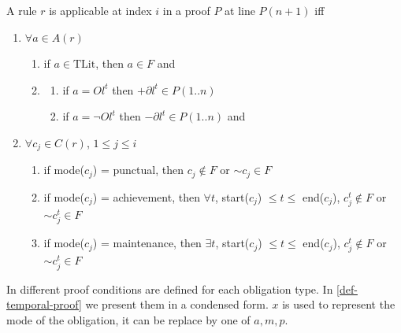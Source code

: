 \documentclass[10pt]{report}
\begin{document}
\begin{mydef} \label{def-temporal-applicable}
A rule $r$ is applicable at index $i$ in a proof $P$ at line $P(n+1)$ iff
\begin{enumerate}
\item $\forall a \in A(r)$
      \begin{enumerate}
      \item if $a \in \mbox{TLit}$, then $a \in F$ and
      \item \begin{enumerate}
            \item if $a = Ol^t$ then $+\partial l^t \in P(1..n)$
            \item if $a = \neg Ol^t$ then $-\partial l^t \in P(1..n)$ and
            \end{enumerate}
      \end{enumerate}
\item $\forall c_j \in C(r)$, $1 \leq j \leq i$
      \begin{enumerate}
      \item if mode($c_j$) = punctual, then $c_j \notin F$ or $\sim c_j \in F$
      \item if mode($c_j$) = achievement, then $\forall t$, start($c_j$) $\leq t \leq$ end($c_j$), $c^t_j \notin F$ or $\sim c^t_j \in F$
      \item if mode($c_j$) = maintenance, then $\exists t$, start($c_j$) $\leq t \leq$ end($c_j$), $c^t_j \notin F$ or $\sim c^t_j \in F$
      \end{enumerate}
\end{enumerate}
\end{mydef}

In \autocite{JusticeDelayed2011} different proof conditions are defined for each obligation type. In \ref{def-temporal-proof} we present them in a condensed form. $x$ is used to represent the mode of the obligation, it can be replace by one of ${a,m,p}$.
\end{document}
